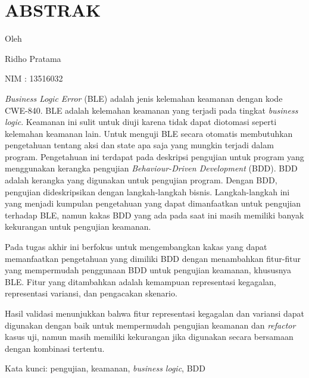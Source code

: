 \clearpage
\chapter*{ABSTRAK}

\begin{center}

  \Large \bfseries \MakeUppercase{\thetitle}
\end{center}

\begin{center}
  Oleh

  Ridho Pratama

  NIM : 13516032

\end{center}

\emph{Business Logic Error} (BLE) adalah jenis kelemahan keamanan dengan kode CWE-840.
BLE adalah kelemahan keamanan yang terjadi pada tingkat \emph{business logic}.
Keamanan ini sulit untuk diuji karena tidak dapat diotomasi seperti kelemahan keamanan lain.
Untuk menguji BLE secara otomatis membutuhkan pengetahuan tentang aksi dan state apa saja
yang mungkin terjadi dalam program. Pengetahuan ini terdapat pada deskripsi pengujian untuk
program yang menggunakan kerangka pengujian \emph{Behaviour-Driven Development} (BDD).
BDD adalah kerangka yang digunakan untuk pengujian program. Dengan BDD, pengujian dideskripsikan
dengan langkah-langkah bisnis. Langkah-langkah ini yang menjadi kumpulan pengetahuan yang dapat
dimanfaatkan untuk pengujian terhadap BLE, namun kakas BDD yang ada pada saat ini masih memiliki
banyak kekurangan untuk pengujian keamanan.

Pada tugas akhir ini berfokus untuk mengembangkan kakas yang dapat memanfaatkan pengetahuan yang
dimiliki BDD dengan menambahkan fitur-fitur yang mempermudah penggunaan BDD untuk pengujian keamanan,
khususnya BLE. Fitur yang ditambahkan adalah kemampuan representasi kegagalan, representasi variansi,
dan pengacakan skenario.

Hasil validasi menunjukkan bahwa fitur representasi kegagalan dan variansi dapat digunakan dengan baik
untuk mempermudah pengujian keamanan dan \emph{refactor} kasus uji, namun masih memiliki kekurangan
jika digunakan secara bersamaan dengan kombinasi tertentu.

Kata kunci: pengujian, keamanan, \emph{business logic}, BDD

\clearpage